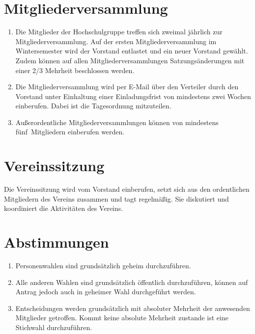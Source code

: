 \documentclass[a4paper]{scrartcl}
\begin{document}
\section{Mitgliederversammlung}
\begin{enumerate}
    \item Die Mitglieder der Hochschulgruppe treffen sich zweimal jährlich zur
          Mitgliederversammlung. Auf der ersten Mitgliederversammlung im
          Wintersemester wird der Vorstand entlastet und ein neuer Vorstand
          gewählt. Zudem können auf allen Mitgliederversammlungen
          Satzungsänderungen mit einer 2/3 Mehrheit beschlossen werden.
    \item Die Mitgliederversammlung wird per E-Mail über den Verteiler
           durch den Vorstand unter Einhaltung einer
          Einladungsfrist von mindestens zwei Wochen einberufen. Dabei ist die
          Tagesordnung mitzuteilen.
    \item Außerordentliche Mitgliederversammlungen können von mindestens
          fünf~Mitgliedern einberufen werden.
\end{enumerate}

\section{Vereinssitzung}
Die Vereinssitzung wird vom Vorstand einberufen, setzt sich aus den
ordentlichen Mitgliedern des Vereins zusammen und tagt regelmäßig. Sie
diskutiert und koordiniert die Aktivitäten des Vereins.

\section{Abstimmungen}
\begin{enumerate}
    \item Personenwahlen sind grundsätzlich geheim durchzuführen.
    \item Alle anderen Wahlen sind grundsätzlich öffentlich durchzuführen,
          können auf Antrag jedoch auch in geheimer Wahl durchgeführt werden.
    \item Entscheidungen werden grundsätzlich mit absoluter Mehrheit der
          anwesenden Mitglieder getroffen. Kommt keine absolute Mehrheit
          zustande ist eine Stichwahl durchzuführen.
\end{enumerate}
\end{document}
